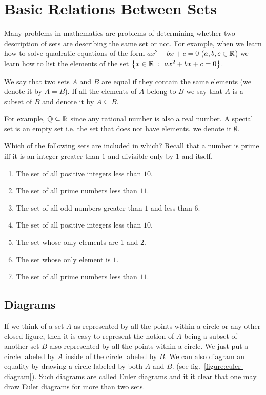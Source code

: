 \section{Basic Relations Between Sets}
Many problems in mathematics are problems of determining whether two description
of sets are describing the same set or not. For example, when we learn how to
solve quadratic equations of the form $ax^2 + bx + c = 0$ ($a, b, c \in \mathbb{R}$) we
learn how to list the elements of the set $\set[ax^2 + bx + c = 0]{x \in \R}$.

We say that two sets $A$ and $B$ are equal if they contain the
same elements (we denote it by $A = B$). If all the elements of $A$ belong to
$B$ we say that $A$ is a subset of $B$ and denote it by $A \subseteq B$.

For example, $\mathbb{Q} \subseteq \mathbb{R}$ since any rational number is
also a real number.
A special set is an empty set i.e. the set that does not have elements, we
denote it $\emptyset$.

\begin{exercise}
  \label{exercise:inclusion}

  Which of the following sets are included in which? Recall that a number is
  prime iff it is an integer greater than $1$ and divisible only by $1$ and
  itself.
  \begin{enumerate}
    \item The set of all positive integers less than $10$.
    \item The set of all prime numbers less than $11$.
    \item The set of all odd numbers greater than $1$ and less than $6$.
    \item The set of all positive integers less than $10$.
    \item The set whose only elements are $1$ and $2$.
    \item The set whose only element is $1$.
    \item The set of all prime numbers less than $11$.
  \end{enumerate}
\end{exercise}

\subsection{Diagrams}
If we think of a set $A$ as represented by all the points within a circle or
any other closed figure, then it is easy to represent the notion of $A$ being a
subset of another set $B$ also represented by all the points within a circle.
We just put a circle labeled by $A$ inside of the circle labeled by $B$. We can
also diagram an equality by drawing a circle labeled by both $A$ and $B$. (see
fig.~\ref{figure:euler-diagram}). Such diagrams are called Euler diagrams and
it it clear that one may draw Euler diagrams for more than two sets.

